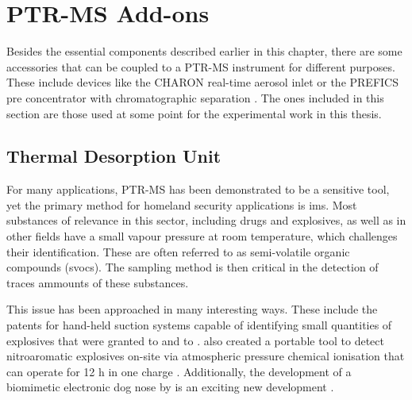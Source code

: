 



\section{PTR-MS Add-ons}
Besides the essential components described  earlier in this chapter, there are some accessories that can be coupled to a PTR-MS instrument for different purposes.
These include devices  like the CHARON real-time aerosol inlet  or the PREFICS pre concentrator with chromatographic separation \cite{muller2017direct,piel2019airborne,prefics}.
The ones included in this section are those used at some point for the experimental work in this thesis.




\subsection{Thermal Desorption Unit}\label{section:tdu}
For many applications, PTR-MS has been demonstrated to be a sensitive tool, yet the primary method for homeland security applications is \acrshort{ims}.
%
Most substances of relevance in this sector, including drugs and explosives, as well as in other fields have a small vapour pressure at room temperature, which challenges their identification. These are often referred to as semi-volatile organic compounds (\acrshort{svoc}s).
%
The sampling method is then critical in the detection of traces ammounts of these substances.


This issue has been approached in many interesting ways.
%
These include the patents for hand-held suction systems capable of identifying small quantities of explosives that were granted to \citeauthor{conrad1992hand} and to \citeauthor{carroll1992hand} \cite{conrad1992hand,carroll1992hand}.
%
\citeauthor{jjunju2015hand} also created a portable tool to detect nitroaromatic explosives on-site via atmospheric pressure chemical ionisation that can operate for 12 h in one charge \cite{jjunju2015hand}.
%
Additionally, the development of a biomimetic electronic dog nose by \citeauthor{staymates2016biomimetic} is an exciting new development \cite{staymates2016biomimetic}.



